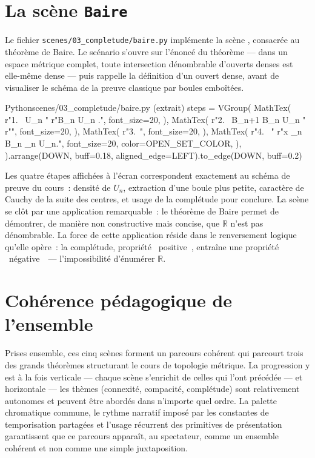 \documentclass[12pt, a4paper, openany]{report}
\begin{document}
	\section{La scène \texttt{Baire}}

	Le fichier \texttt{scenes/03\_completude/baire.py} implémente la scène , consacrée au théorème de Baire. Le scénario s’ouvre sur l’énoncé du théorème — dans un espace métrique complet, toute intersection dénombrable d’ouverts denses est elle-même dense — puis rappelle la définition d’un ouvert dense, avant de visualiser le schéma de la preuve classique par boules emboîtées.

	\begin{codefile}{Python}{scenes/03\_completude/baire.py (extrait)}
steps = VGroup(
    MathTex(
        r"1.\  U_n  "
        r"B_n \cap U_n \neq \varnothing.",
        font_size=20,
    ),
    MathTex(
        r"2.\  B_{n+1} \subset B_n \cap U_n "
        r"",
        font_size=20,
    ),
    MathTex(
        r"3.\ ",
        font_size=20,
    ),
    MathTex(
        r"4.\  "
        r"x \in \bigcap_n B_n \subset \bigcap_n U_n.",
        font_size=20,
        color=OPEN_SET_COLOR,
    ),
).arrange(DOWN, buff=0.18, aligned_edge=LEFT).to_edge(DOWN, buff=0.2)
	\end{codefile}

	Les quatre étapes affichées à l’écran correspondent exactement au schéma de preuve du cours~: densité de $U_n$, extraction d’une boule plus petite, caractère de Cauchy de la suite des centres, et usage de la complétude pour conclure. La scène se clôt par une application remarquable~: le théorème de Baire permet de démontrer, de manière non constructive mais concise, que $\mathbb{R}$ n’est pas dénombrable. La force de cette application réside dans le renversement logique qu’elle opère~: la complétude, propriété \og~positive~\fg, entraîne une propriété \og~négative~\fg\ — l’impossibilité d’énumérer $\mathbb{R}$.

	\section{Cohérence pédagogique de l’ensemble}

	Prises ensemble, ces cinq scènes forment un parcours cohérent qui parcourt trois des grands théorèmes structurant le cours de topologie métrique. La progression y est à la fois verticale — chaque scène s’enrichit de celles qui l’ont précédée — et horizontale — les thèmes (connexité, compacité, complétude) sont relativement autonomes et peuvent être abordés dans n’importe quel ordre. La palette chromatique commune, le rythme narratif imposé par les constantes de temporisation partagées et l’usage récurrent des primitives de présentation garantissent que ce parcours apparaît, au spectateur, comme un ensemble cohérent et non comme une simple juxtaposition.
\end{document}
